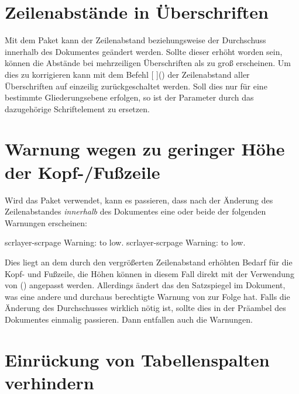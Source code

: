 \section{%
  Zeilenabstände in Überschriften%
  \label{sec:tips:headings}%
}

Mit dem Paket  kann der Zeilenabstand beziehungsweise der 
Durchschuss innerhalb des Dokumentes geändert werden. Sollte dieser erhöht 
worden sein, können die Abstände bei mehrzeiligen Überschriften als zu groß 
erscheinen. Um dies zu korrigieren kann mit dem Befehl 
[%
]()
der Zeilenabstand aller Überschriften auf einzeilig zurückgeschaltet werden. 
Soll dies nur für eine bestimmte Gliederungsebene erfolgen, so ist der 
Parameter  durch das dazugehörige Schriftelement zu 
ersetzen.



\section{%
  Warnung wegen zu geringer Höhe der Kopf-/Fußzeile%
  \label{sec:tips:headline}%
}

Wird das Paket  verwendet, kann es passieren, dass nach der 
Änderung des Zeilenabstandes \emph{innerhalb} des Dokumentes eine oder beide 
der folgenden Warnungen erscheinen:
%
\begin{quoting}
\begin{Code}
scrlayer-scrpage Warning: \headheight to low.
scrlayer-scrpage Warning: \footheight to low.
\end{Code}
\end{quoting}
%
Dies liegt an dem durch den vergrößerten Zeilenabstand erhöhten Bedarf für die
Kopf- und Fußzeile, die Höhen können in diesem Fall direkt mit der Verwendung 
von () angepasst werden. Allerdings 
ändert das den Satzspiegel im Dokument, was eine andere und durchaus 
berechtigte Warnung von  zur Folge hat. Falls die Änderung 
des Durchschusses wirklich nötig ist, sollte dies in der Präambel des 
Dokumentes einmalig passieren. Dann entfallen auch die Warnungen.



\section{%
  Einrückung von Tabellenspalten verhindern%
  \label{sec:tips:table}%
}

